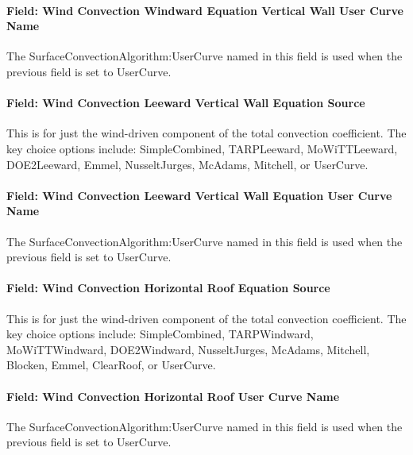 \paragraph{Field: Wind Convection Windward Equation Vertical Wall User Curve Name}\label{field-wind-convection-windward-equation-vertical-wall-user-curve-name}

The SurfaceConvectionAlgorithm:UserCurve named in this field is used when the previous field is set to UserCurve.

\paragraph{Field: Wind Convection Leeward Vertical Wall Equation Source}\label{field-wind-convection-leeward-vertical-wall-equation-source}

This is for just the wind-driven component of the total convection coefficient. The key choice options include: SimpleCombined, TARPLeeward, MoWiTTLeeward, DOE2Leeward, Emmel, NusseltJurges, McAdams, Mitchell, or UserCurve.

\paragraph{Field: Wind Convection Leeward Vertical Wall Equation User Curve Name}\label{field-wind-convection-leeward-vertical-wall-equation-user-curve-name}

The SurfaceConvectionAlgorithm:UserCurve named in this field is used when the previous field is set to UserCurve.

\paragraph{Field: Wind Convection Horizontal Roof Equation Source}\label{field-wind-convection-horizontal-roof-equation-source}

This is for just the wind-driven component of the total convection coefficient. The key choice options include: SimpleCombined, TARPWindward, MoWiTTWindward, DOE2Windward, NusseltJurges, McAdams, Mitchell, Blocken, Emmel, ClearRoof, or UserCurve.

\paragraph{Field: Wind Convection Horizontal Roof User Curve Name}\label{field-wind-convection-horizontal-roof-user-curve-name}

The SurfaceConvectionAlgorithm:UserCurve named in this field is used when the previous field is set to UserCurve.

